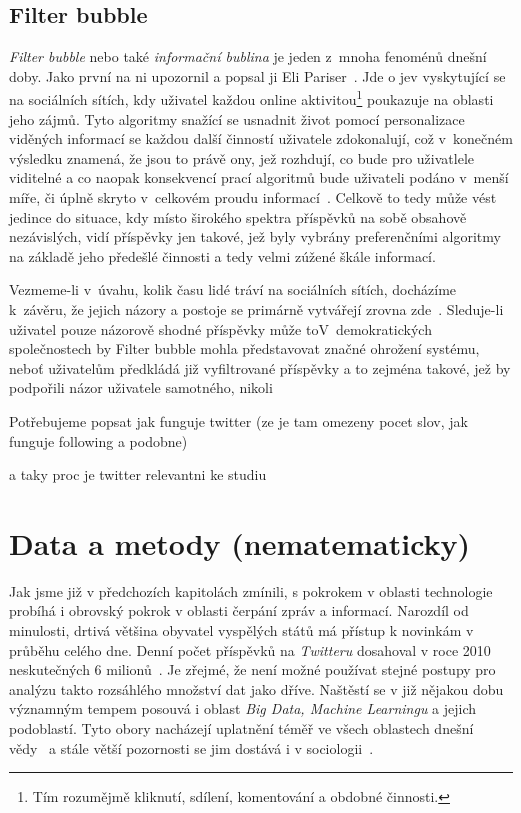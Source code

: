 \documentclass[12pt, a4paper]{article}
\numberwithin{equation}{section} 	%
\begin{document}
\subsection{Filter bubble}
\noindent \textit{Filter bubble} nebo také \textit{informační bublina} je jeden z mnoha fenoménů dnešní doby. Jako první na ni upozornil a popsal ji Eli Pariser~\cite{Pariser2011, PariserTed}. Jde o jev vyskytující se na sociálních sítích, kdy uživatel každou online aktivitou\footnote{Tím rozumějmě kliknutí, sdílení, komentování a obdobné činnosti.} poukazuje na oblasti jeho zájmů. Tyto algoritmy snažící se usnadnit život pomocí personalizace viděných informací se každou další činností uživatele zdokonalují, což v konečném výsledku znamená, že jsou to právě ony, jež rozhdují, co bude pro uživatlele viditelné a co naopak konsekvencí prací algoritmů bude uživateli podáno v menší míře, či úplně skryto v celkovém proudu informací~\cite{TheImpactOfFilterBubble}. Celkově to tedy může vést jedince do situace, kdy místo širokého spektra příspěvků na sobě obsahově nezávislých, vidí příspěvky jen takové, jež byly vybrány preferenčními algoritmy na základě jeho předešlé činnosti a tedy velmi zúžené škále informací.

Vezmeme-li v úvahu, kolik času lidé tráví na sociálních sítích, docházíme k závěru, že jejich názory a postoje se primárně vytvářejí zrovna zde~\cite{TheImpactOfFilterBubble, BeyondFilterBubble}.  Sleduje-li uživatel pouze názorově shodné příspěvky může toV demokratických společnostech by Filter bubble mohla představovat značné ohrožení systému, neboť  uživatelům předkládá již vyfiltrované příspěvky a to zejména takové, jež by podpořili názor uživatele samotného, nikoli




Potřebujeme popsat jak funguje twitter (ze je tam omezeny pocet slov, jak funguje following a podobne)~\cite{wikiTwitter}

a taky proc je twitter relevantni ke studiu~\cite{whyNewsOnTwitter}

\newpage
\section{Data a metody (nematematicky)}
\noindent Jak jsme již v předchozích kapitolách zmínili, s pokrokem v oblasti technologie probíhá i obrovský pokrok v oblasti čerpání zpráv a informací. Narozdíl od minulosti, drtivá většina obyvatel vyspělých států má přístup k novinkám v průběhu celého dne. Denní počet příspěvků na \textit{Twitteru} dosahoval v roce 2010 neskutečných 6 milionů~\cite{Mathioudakis2010}. Je zřejmé, že není možné používat stejné postupy pro analýzu takto rozsáhlého množství dat jako dříve. Naštěstí se v již nějakou dobu významným tempem posouvá i oblast \textit{Big Data, Machine Learningu} a jejich podoblastí. Tyto obory nacházejí uplatnění téměř ve všech oblastech dnešní vědy~\cite{Huberman2012-2-15} a stále větší pozornosti se jim dostává i v sociologii~\cite{Tinati2014, McFarland2016, Shah2015-04-09}.
\end{document}
